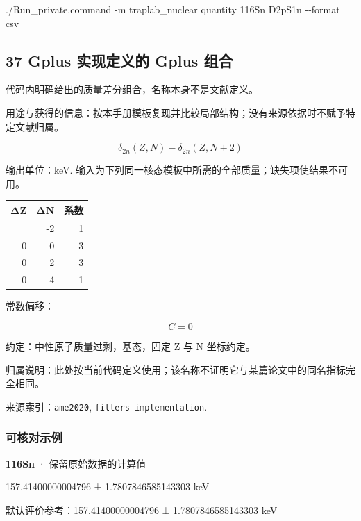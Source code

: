 \documentclass[
  11pt,
  letterpaper,
]{article}
\newenvironment{Shaded}{}{}
\newcommand{\AttributeTok}[1]{\textcolor[rgb]{0.49,0.56,0.16}{#1}}
\newcommand{\ExtensionTok}[1]{#1}
\newcommand{\NormalTok}[1]{#1}
\begin{document}
\begin{Shaded}
\begin{Highlighting}[]
\ExtensionTok{./Run\_private.command} \AttributeTok{{-}m}\NormalTok{ traplab\_nuclear quantity 116Sn D2pS1n }\AttributeTok{{-}{-}format}\NormalTok{ csv}
\end{Highlighting}
\end{Shaded}

\subsection{37 Gplus 实现定义的 Gplus
组合}\label{gplus-ux5b9eux73b0ux5b9aux4e49ux7684-gplus-ux7ec4ux5408}

代码内明确给出的质量差分组合，名称本身不是文献定义。

用途与获得的信息：按本手册模板复现并比较局部结构；没有来源依据时不赋予特定文献归属。

\[
\delta_{2n}(Z,N)-\delta_{2n}(Z,N+2)
\]

输出单位：keV.
输入为下列同一核态模板中所需的全部质量；缺失项使结果不可用。

\begin{longtable}[]{@{}rrr@{}}
\toprule\noalign{}
ΔZ & ΔN & 系数 \\
\midrule\noalign{}
\endhead
\bottomrule\noalign{}
\endlastfoot
0 & -2 & 1 \\
0 & 0 & -3 \\
0 & 2 & 3 \\
0 & 4 & -1 \\
\end{longtable}

常数偏移：

\[
C=0
\]

约定：中性原子质量过剩，基态，固定 Z 与 N 坐标约定。

归属说明：此处按当前代码定义使用；该名称不证明它与某篇论文中的同名指标完全相同。

来源索引：\texttt{ame2020}, \texttt{filters-implementation}.

\subsubsection{可核对示例}\label{ux53efux6838ux5bf9ux793aux4f8b-36}

\textbf{116Sn} · 保留原始数据的计算值

157.41400000004796 ± 1.7807846585143303 keV

默认评价参考：157.41400000004796 ± 1.7807846585143303 keV
\end{document}
